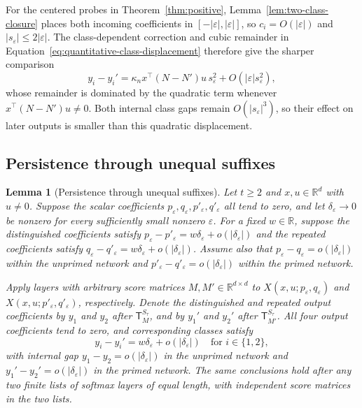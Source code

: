 \documentclass[mlmain]{jmlr}
\newcommand{\T}{\mathsf{T}}
\newtheorem{mylemma}{Lemma}
\begin{document}
For the centered probes in Theorem~\ref{thm:positive},
Lemma~\ref{lem:two-class-closure} places both incoming coefficients in
$[-|\varepsilon|,|\varepsilon|]$, so $c_i=O(|\varepsilon|)$ and
$|s_\varepsilon|\le2|\varepsilon|$.  The class-dependent correction and
cubic remainder in Equation~\eqref{eq:quantitative-class-displacement}
therefore give the sharper comparison
\begin{equation}
 y_i-y_i'
 =\kappa_n x^\top(N-N')u\,s_\varepsilon^2
  +O(|\varepsilon|s_\varepsilon^2),
 \label{eq:quantitative-quadratic-signal}
\end{equation}
whose remainder is dominated by the quadratic term whenever
$x^\top(N-N')u\ne0$.  Both internal class gaps remain
$O(|s_\varepsilon|^3)$, so their effect on later outputs is smaller than
this quadratic displacement.

\subsection{Persistence through unequal suffixes}

\begin{mylemma}[Persistence through unequal suffixes]
\label{lem:suffix-persistence}
Let $t\ge2$ and $x,u\in\mathbb R^d$ with $u\ne0$.  Suppose the scalar
coefficients $p_\varepsilon,q_\varepsilon,p'_\varepsilon,q'_\varepsilon$
all tend to zero, and let $\delta_\varepsilon\to0$ be nonzero for every
sufficiently small nonzero $\varepsilon$.  For a fixed $w\in\mathbb R$,
suppose the distinguished coefficients satisfy
$p_\varepsilon-p'_\varepsilon=w\delta_\varepsilon+o(|\delta_\varepsilon|)$
and the repeated coefficients satisfy
$q_\varepsilon-q'_\varepsilon=w\delta_\varepsilon+o(|\delta_\varepsilon|)$.
Assume also that $p_\varepsilon-q_\varepsilon=o(|\delta_\varepsilon|)$
within the unprimed network and
$p'_\varepsilon-q'_\varepsilon=o(|\delta_\varepsilon|)$ within the primed
network.

Apply layers with arbitrary score matrices $M,M'\in\mathbb R^{d\times d}$ to
$X(x,u;p_\varepsilon,q_\varepsilon)$ and
$X(x,u;p'_\varepsilon,q'_\varepsilon)$, respectively.  Denote the
distinguished and repeated output coefficients by $y_1$ and $y_2$ after
$\T_M^{S_\tau}$, and by $y_1'$ and $y_2'$ after $\T_{M'}^{S_\tau}$.
All four output coefficients tend to zero, and corresponding classes
satisfy
\begin{equation}
 y_i-y_i'=w\delta_\varepsilon+o(|\delta_\varepsilon|)
 \quad\text{for }i\in\{1,2\},
 \label{eq:suffix-persistence-output-corresponding}
\end{equation}
with internal gap $y_1-y_2=o(|\delta_\varepsilon|)$ in the unprimed
network and $y_1'-y_2'=o(|\delta_\varepsilon|)$ in the primed network.
The same conclusions hold after any two finite lists of softmax layers
of equal length, with independent score matrices in the two lists.
\end{mylemma}
\end{document}
